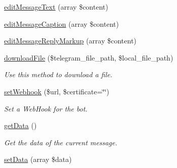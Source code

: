 \begin{DoxyCompactItemize}
\hyperlink{class_telegram_afbc4f6fd5f28a20e1bea0b083863b688}{edit\+Message\+Text} (array \$content)
\item 
\hyperlink{class_telegram_a3531b07c9dc7afb693c6e956e5debdad}{edit\+Message\+Caption} (array \$content)
\item 
\hyperlink{class_telegram_acd615562e6a6eeeb3d8a825eb03e3e5f}{edit\+Message\+Reply\+Markup} (array \$content)
\item 
\hyperlink{class_telegram_af08c6bc7982d71857f05c0756221a703}{download\+File} (\$telegram\+\_\+file\+\_\+path, \$local\+\_\+file\+\_\+path)
\begin{DoxyCompactList}\small\item\em Use this method to download a file. \end{DoxyCompactList}\item 
\hyperlink{class_telegram_ae94b55864cae3e7751e7293585eec9f5}{set\+Webhook} (\$url, \$certificate=\char`\"{}\char`\"{})
\begin{DoxyCompactList}\small\item\em Set a Web\+Hook for the bot. \end{DoxyCompactList}\item 
\hyperlink{class_telegram_a81a67162a6288d78fc4c55283325f0b4}{get\+Data} ()
\begin{DoxyCompactList}\small\item\em Get the data of the current message. \end{DoxyCompactList}\item 
\hypertarget{class_telegram_a87449bdd364c33ff024d32896342bf31}{}\hyperlink{class_telegram_a87449bdd364c33ff024d32896342bf31}{set\+Data} (array \$data)\label{class_telegram_a87449bdd364c33ff024d32896342bf31}


\end{DoxyCompactItemize}
